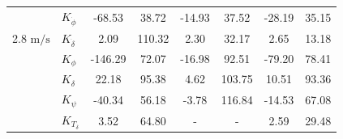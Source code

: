 \begin{table}[]
\begin{tabular}{llcccccc}
                                                   & $K_{\dot{\phi}} $                                      & -68.53                                      & 38.72                                                & -14.93                                      & 37.52                                                & -28.19                                      & 35.15                                                \\
    \multirow{-2}{*}{2.8 $\si{\meter\per\second}$} & $K_{\dot{\delta}}$                                     & 2.09                                        & 110.32                                               & 2.30                                        & 32.17                                                & 2.65                                        & 13.18                                                \\
                                                   & $K_{\phi} $                                            & -146.29                                     & 72.07                                                & -16.98                                      & 92.51                                                & -79.20                                      & 78.41                                                \\
                                                   & $K_\delta $                                            & 22.18                                       & 95.38                                                & 4.62                                        & 103.75                                               & 10.51                                       & 93.36                                                \\
                                                   & $K_\psi $                                              & -40.34                                      & 56.18                                                & -3.78                                       & 116.84                                               & -14.53                                      & 67.08                                                \\
                                                   & $K_{T_\delta}$                                         & 3.52                                        & 64.80                                                & -                                           & -                                                    & 2.59                                        & 29.48                                                \\ \cline{2-8} 

\end{tabular}
\end{table}
